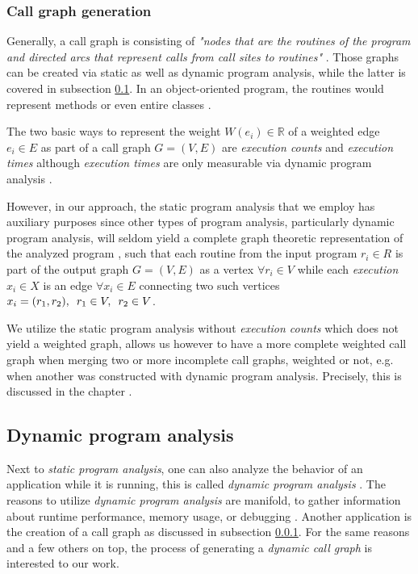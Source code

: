 \documentclass[12pt,a4paper]{report}
\begin{document}
\subsubsection{Call graph generation} \label{subsubsect:call-graph-static}
Generally, a call graph is consisting of \textit{"nodes that are the routines
of the program and directed arcs that represent calls from call sites to
routines"} \cite{graham1982gprof}. Those graphs can be created via static
as well as dynamic program analysis, while the latter is covered in
subsection \ref{subsect:background-dynamic-analysis}.
In an object-oriented program, the routines would represent methods
or even entire classes \cite{grove1997callgraph}.

The two basic ways to represent the weight \(W(e_i) \in \mathbb{R}\)
of a weighted edge \(e_i \in E\) as part of a call graph \(G = (V, E)\)
are \textit{execution counts} and \textit{execution times} although
\textit{execution times} are only measurable via
dynamic program analysis \cite{graham1982gprof}.

However, in our approach, the static program analysis that we employ has
auxiliary purposes since other types of program analysis, particularly
dynamic program analysis, will seldom yield a complete graph theoretic
representation of the analyzed program \cite{graham1982gprof}, such that
each routine from the input program \(r_i \in R\) is part of the output graph
\(G = (V, E)\) as a vertex \(\forall r_i \in V\) while each \textit{execution}
\(x_i \in X\) is an edge \(\forall x_i \in E\) connecting
two such vertices \(x_i = (r_1, r_2), \enskip r_1 \in V, \enskip r_2 \in V\).

We utilize the static program analysis without \textit{execution counts}
which does not yield a weighted graph, allows us however to have a more complete
weighted call graph when merging two or more incomplete call graphs,
weighted or not, e.g. when another was constructed with dynamic program analysis.
Precisely, this is discussed in the chapter \textit{}.


\subsection{Dynamic program analysis} \label{subsect:background-dynamic-analysis}

Next to \textit{static program analysis}, one can also analyze the behavior of
an application while it is running, this is called
\textit{dynamic program analysis} \cite{ernst2003static}.
The reasons to utilize \textit{dynamic program analysis} are manifold,
to gather information about runtime performance, memory usage,
or debugging \cite{ernst2003static}.
Another application is the creation of a call graph as discussed in subsection
\ref{subsubsect:call-graph-static}. For the same reasons and a few others on top,
the process of generating a \textit{dynamic call graph} is interested to our work.
\end{document}

